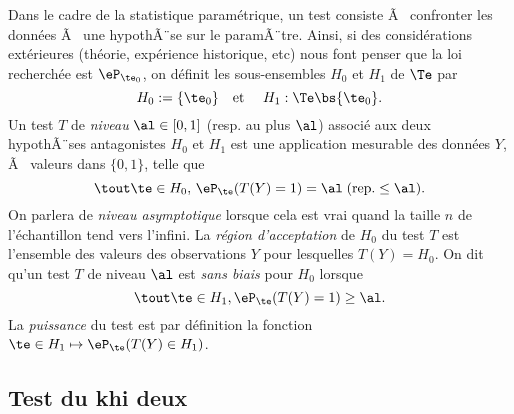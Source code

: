 Dans le cadre de la statistique paramétrique, un test consiste Ã  confronter
les données Ã  une hypothÃ¨se sur le paramÃ¨tre. Ainsi, si des considérations
extérieures (théorie, expérience historique, etc) nous font penser que la loi
recherchée est $\eP_{\te_0}$, on définit les sous-ensembles $H_0$ et $H_1$ de
$\Te$ par
$$
H_0:=\{\te_0\}
\text{\quad et \quad}
H_1: \Te\bs\{\te_0\}.
$$
Un test $T$ de \emph{niveau} $\al\in[0,1]$ (resp. au plus $\al$) associé aux
deux hypothÃ¨ses antagonistes $H_0$ et $H_1$ est une application mesurable des
données $Y$, Ã  valeurs dans $\{0,1\}$, telle que
$$
\tout\te\in H_0,\,\eP_\te(T(Y)=1) = \al\; (\text{rep.} \leq \al).
$$
On parlera de \emph{niveau asymptotique} lorsque cela est vrai quand la
taille $n$ de l'échantillon tend vers l'infini. La \emph{région d'acceptation}
de $H_0$ du test $T$ est l'ensemble des valeurs des observations $Y$ pour
lesquelles $T(Y)=H_0$. On dit qu'un test $T$ de niveau $\al$ est \emph{sans
  biais} pour $H_0$ lorsque
$$
\tout\te\in H_1, \eP_\te(T(Y)=1) \geq \al.
$$
La \emph{puissance} du test est par définition la fonction $\te\in H_1
\mapsto \eP_\te(T(Y)\in H_1)$.


%
\subsection{Test du khi deux}
\label{ss:test-chideux}
%


